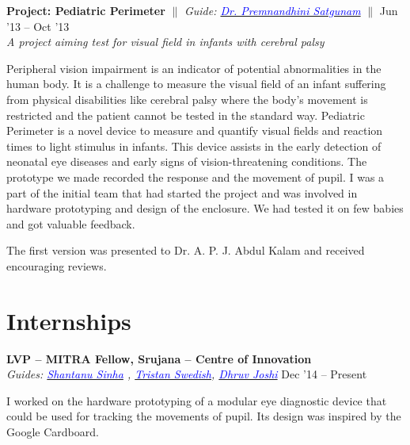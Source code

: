 \documentclass[margin,line]{res}
\newenvironment{list1}{
  \begin{list}{\ding{113}}{%
      \setlength{\itemsep}{0in}
      \setlength{\parsep}{0in} \setlength{\parskip}{0in}
      \setlength{\topsep}{0in} \setlength{\partopsep}{0in} 
      \setlength{\leftmargin}{0.17in}}}{\end{list}}
\begin{document}
\begin{resume}
\begin{list1}
\item[]\textbf{Project: Pediatric Perimeter} \hfill $\|$ \hfill {\em Guide: \href{http://www.lvpei.org/our-team/our-team-Premnandhini.php}{\textcolor{blue} {Dr. Premnandhini Satgunam}}} \hfill $\|$ \hfill {Jun '13 -- Oct '13} \\
\textit{A project aiming test for visual field in infants with cerebral palsy} 
\vspace{4pt}

\noindent Peripheral vision impairment is an indicator of potential abnormalities in the human body. It is a challenge to measure the visual field of an infant suffering from physical disabilities like cerebral palsy where the body's movement is restricted and the patient cannot be tested in the standard way. Pediatric Perimeter is a novel device to measure and quantify visual fields and reaction times to light stimulus in infants. This device assists in the early detection of neonatal eye diseases and early signs of vision-threatening conditions. 
The prototype we made recorded the response and the movement of pupil. I was a part of the initial team that had started the project and was involved in hardware prototyping and design of the enclosure. We had tested it on few babies and got valuable feedback. 

\noindent The first version was presented to Dr. A. P. J. Abdul Kalam and received encouraging reviews. 
\end{list1}

\vspace{-.1cm}

\section{\sc Internships}

{\bf LVP -- MITRA Fellow, Srujana -- Centre of Innovation} \\
{\em Guides: \href{https://www.media.mit.edu/~sssinha}{\textcolor{blue}{Shantanu Sinha}} , \href{https://web.media.mit.edu/~tswedish/}{\textcolor{blue}{Tristan Swedish}}, \href{https://www.linkedin.com/in/derbedhruv}{\textcolor{blue}{Dhruv Joshi}}} \hfill {Dec '14 -- Present} \\
\vspace*{-.13in}
\begin{list1}
\item[]
I worked on the hardware prototyping of a modular eye diagnostic device that could be used for tracking the movements of pupil. Its design was inspired by the Google Cardboard. 
\end{list1}


\end{resume}
\end{document}
